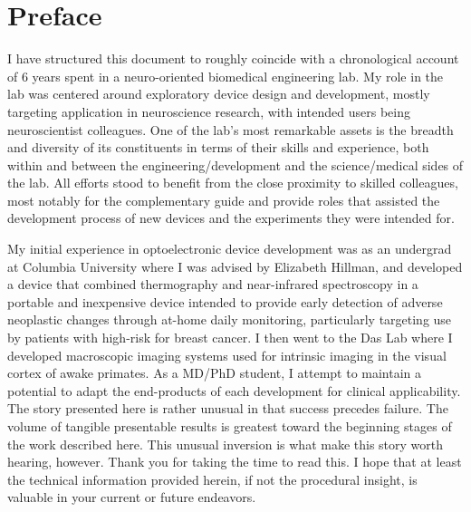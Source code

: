 \hypertarget{preface}{%
\chapter*{Preface}\label{preface}}

I have structured this document to roughly coincide with a chronological account of 6 years spent in a neuro-oriented biomedical engineering lab.
My role in the lab was centered around exploratory device design and development, mostly targeting application in neuroscience research, with intended users being neuroscientist colleagues.
One of the lab's most remarkable assets is the breadth and diversity of its constituents in terms of their skills and experience, both within and between the engineering/development and the science/medical sides of the lab.
All efforts stood to benefit from the close proximity to skilled colleagues, most notably for the complementary guide and provide roles that assisted the development process of new devices and the experiments they were intended for.

My initial experience in optoelectronic device development was as an undergrad at Columbia University where I was advised by Elizabeth Hillman, and developed a device that combined thermography and near-infrared spectroscopy in a portable and inexpensive device intended to provide early detection of adverse neoplastic changes through at-home daily monitoring, particularly targeting use by patients with high-risk for breast cancer.
I then went to the Das Lab where I developed macroscopic imaging systems used for intrinsic imaging in the visual cortex of awake primates.
As a MD/PhD student, I attempt to maintain a potential to adapt the end-products of each development for clinical applicability.
The story presented here is rather unusual in that success precedes failure.
The volume of tangible presentable results is greatest toward the beginning stages of the work described here.
This unusual inversion is what make this story worth hearing, however.
Thank you for taking the time to read this.
I hope that at least the technical information provided herein, if not the procedural insight, is valuable in your current or future endeavors.
